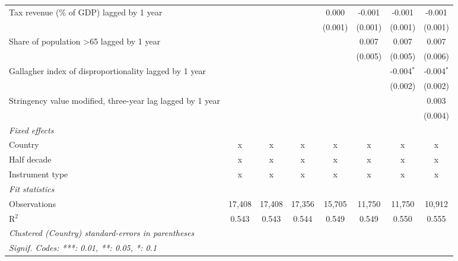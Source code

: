 \begin{tabular}{lccccccc}
   Tax revenue (\% of GDP) lagged by 1 year                                       &         &         &         & 0.000   & -0.001       & -0.001        & -0.001\\   
                                                                                  &         &         &         & (0.001) & (0.001)      & (0.001)       & (0.001)\\   
   Share of population >65 lagged by 1 year                                       &         &         &         &         & 0.007        & 0.007         & 0.007\\   
                                                                                  &         &         &         &         & (0.005)      & (0.005)       & (0.006)\\   
   Gallagher index of disproportionality lagged by 1 year                         &         &         &         &         &              & -0.004$^{*}$  & -0.004$^{*}$\\   
                                                                                  &         &         &         &         &              & (0.002)       & (0.002)\\   
   Stringency value modified, three-year lag lagged by 1 year                     &         &         &         &         &              &               & 0.003\\   
                                                                                  &         &         &         &         &              &               & (0.004)\\   
   \emph{Fixed effects}\\
   Country                                                                        & x       & x       & x       & x       & x            & x             & x\\  
   Half decade                                                                    & x       & x       & x       & x       & x            & x             & x\\  
   Instrument type                                                                & x       & x       & x       & x       & x            & x             & x\\  
   \midrule \emph{Fit statistics}\\
   Observations                                                                   & 17,408  & 17,408  & 17,356  & 15,705  & 11,750       & 11,750        & 10,912\\  
   R$^2$                                                                          & 0.543   & 0.543   & 0.544   & 0.549   & 0.549        & 0.550         & 0.555\\  
   \midrule
   \multicolumn{8}{l}{\emph{Clustered (Country) standard-errors in parentheses}}\\
   \multicolumn{8}{l}{\emph{Signif. Codes: ***: 0.01, **: 0.05, *: 0.1}}\\
\end{tabular}
\par\endgroup


